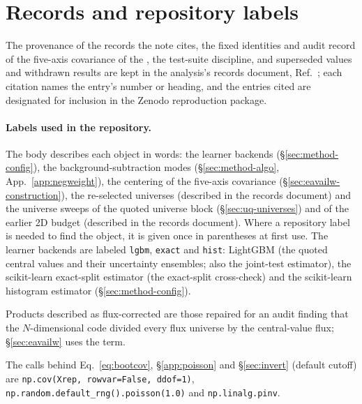 \section*{Records and repository labels}

The provenance of the records the note cites, the fixed identities and audit record of the five-axis covariance of the \resFiveAxis{}, the test-suite discipline, and superseded values and withdrawn results are kept in the analysis's records document, Ref.~\cite{NoteRecords2026}; each citation names the entry's number or heading, and the entries cited are designated for inclusion in the Zenodo reproduction package.

\paragraph{Labels used in the repository.} The body describes each object in words: the learner backends (\S\ref{sec:method-config}), the background-subtraction modes (\S\ref{sec:method-algo}, App.~\ref{app:negweight}), the centering of the five-axis covariance (\S\ref{sec:eavailw-construction}), the re-selected universes (described in the records document) and the universe sweeps of the quoted universe block (\S\ref{sec:uq-universes}) and of the earlier 2D budget (described in the records document). Where a repository label is needed to find the object, it is given once in parentheses at first use. The learner backends are labeled \texttt{lgbm}, \texttt{exact} and \texttt{hist}: LightGBM (the quoted central values and their uncertainty ensembles; also the joint-test estimator), the scikit-learn exact-split estimator (the exact-split cross-check) and the scikit-learn histogram estimator (\S\ref{sec:method-config}).

Products described as flux-corrected are those repaired for an audit finding that the $N$-dimensional code divided every flux universe by the central-value flux; \S\ref{sec:eavailw} uses the term.

The calls behind Eq.~\eqref{eq:bootcov}, \S\ref{app:poisson} and \S\ref{sec:invert} (default cutoff) are \texttt{np.cov(Xrep, rowvar=False, ddof=1)}, \texttt{np.random.\allowbreak default\_rng().\allowbreak poisson(1.0)} and \texttt{np.linalg.pinv}.

